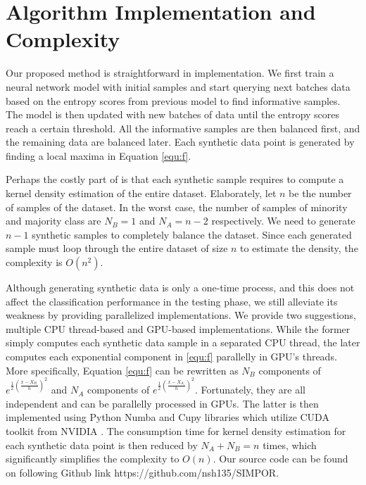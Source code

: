 

\section{Algorithm Implementation and Complexity}
\label{sec:implementation}
Our proposed method is straightforward in implementation. We first train a neural network model with initial samples and start querying next batches data based on the entropy scores from previous model to find informative samples. The model is then updated with new batches of data until the entropy scores reach a certain threshold. All the informative samples are then balanced first, and the remaining data are balanced later. Each synthetic data point is generated by finding a local maxima in Equation \ref{equ:f}.

Perhaps the costly part of \Methodname{} is that each synthetic sample requires to compute a kernel density estimation of the entire dataset. Elaborately, let $n$ be the number of samples of the dataset. In the worst case, the number of samples of minority and majority class are $N_B = 1$ and $N_A = n-2$ respectively. We need to generate $n-1$ synthetic samples to completely balance the dataset. Since each generated sample must loop through the entire dataset of size $n$ to estimate the density, the complexity is $O(n^2)$. 

Although generating synthetic data is only a one-time process, and this does not affect the classification performance in the testing phase, we still alleviate its weakness by providing parallelized implementations. We provide two suggestions, multiple CPU thread-based and GPU-based implementations. While the former simply computes each synthetic data sample in a separated CPU thread, the later computes each exponential component in \ref{equ:f} parallelly in GPU's threads. More specifically, Equation \ref{equ:f} can be rewritten as $N_B$ components of $e^{\frac{1}{2} (\frac {x - X_{B_i}}{h})^2}$ and $N_A$ components of $e^{\frac{1}{2} (\frac {x - X_{A_i}}{h})^2}$. Fortunately, they are all independent and can be parallelly processed in GPUs. The latter is then implemented using Python Numba and Cupy libraries which utilize CUDA toolkit from NVIDIA \cite{cuda}. The consumption time for kernel density estimation for each synthetic data point is then reduced by $N_A+N_B=n$ times, which significantly simplifies the complexity to $O(n)$. Our source code can be found on following Github link  https://github.com/nsh135/SIMPOR. 